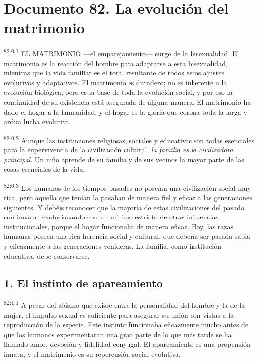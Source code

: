 \chapter{Documento 82. La evolución del matrimonio}
\par
\textsuperscript{82:0.1} EL MATRIMONIO ---el emparejamiento--- surge de la bisexualidad. El matrimonio es la reacción del hombre para adaptarse a esta bisexualidad, mientras que la vida familiar es el total resultante de todos estos ajustes evolutivos y adaptativos. El matrimonio es duradero; no es inherente a la evolución biológica, pero es la base de toda la evolución social, y por eso la continuidad de su existencia está asegurada de alguna manera. El matrimonio ha dado el hogar a la humanidad, y el hogar es la gloria que corona toda la larga y ardua lucha evolutiva.

\par
\textsuperscript{82:0.2} Aunque las instituciones religiosas, sociales y educativas son todas esenciales para la supervivencia de la civilización cultural, \textit{la familia es la civilizadora principal}. Un niño aprende de su familia y de sus vecinos la mayor parte de las cosas esenciales de la vida.

\par
\textsuperscript{82:0.3} Los humanos de los tiempos pasados no poseían una civilización social muy rica, pero aquella que tenían la pasaban de manera fiel y eficaz a las generaciones siguientes. Y debéis reconocer que la mayoría de estas civilizaciones del pasado continuaron evolucionando con un mínimo estricto de otras influencias institucionales, porque el hogar funcionaba de manera eficaz. Hoy, las razas humanas poseen una rica herencia social y cultural, que debería ser pasada sabia y eficazmente a las generaciones venideras. La familia, como institución educativa, debe conservarse.

\section*{1. El instinto de apareamiento}
\par
\textsuperscript{82:1.1} A pesar del abismo que existe entre la personalidad del hombre y la de la mujer, el impulso sexual es suficiente para asegurar su unión con vistas a la reproducción de la especie. Este instinto funcionaba eficazmente mucho antes de que los humanos experimentaran una gran parte de lo que más tarde se ha llamado amor, devoción y fidelidad conyugal. El apareamiento es una propensión innata, y el matrimonio es su repercusión social evolutiva.

